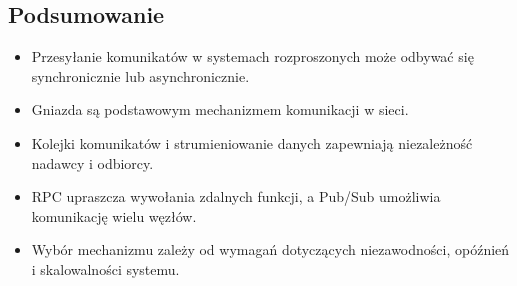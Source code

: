 \subsection{Podsumowanie}
\begin{itemize}
    \item Przesyłanie komunikatów w systemach rozproszonych może odbywać się synchronicznie lub asynchronicznie.
    \item Gniazda są podstawowym mechanizmem komunikacji w sieci.
    \item Kolejki komunikatów i strumieniowanie danych zapewniają niezależność nadawcy i odbiorcy.
    \item RPC upraszcza wywołania zdalnych funkcji, a Pub/Sub umożliwia komunikację wielu węzłów.
    \item Wybór mechanizmu zależy od wymagań dotyczących niezawodności, opóźnień i skalowalności systemu.
\end{itemize}
